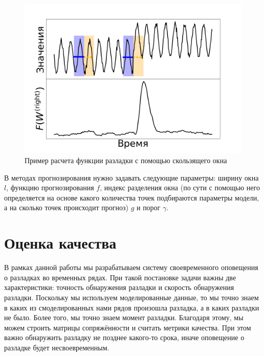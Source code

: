\documentclass[%
12pt,
master,  %
natbib,      %
subf,        %
substylefile = spbu.rtx,
href,        %
colorlinks,  %
]{disser}
\begin{document}
\begin{figure}[!hhh]
	\begin{center}
		\includegraphics[width=12cm]{approaches_first_6_ru}
	\end{center}
	\vspace{-5mm}\caption{Пример расчета функции разладки с помощью скользящего окна}
	\label{fig:predicition_example_2}
\end{figure}

В методах прогнозирования нужно задавать следующие параметры: ширину окна $l$, функцию прогнозирования $f$, индекс разделения окна (по сути с помощью него определяется на основе какого количества точек подбираются параметры модели, а на сколько точек происходит прогноз) $g$ и порог $\gamma$.



\section{Оценка качества}

В рамках данной работы мы разрабатываем систему своевременного оповещения о разладках во временных рядах. При такой постановке задачи важны две характеристики: точность обнаружения разладки и скорость обнаружения разладки. Поскольку мы используем моделированные данные, то мы точно знаем в каких из смоделированных нами рядов произошла разладка, а в каких разладки не было. Более того, мы точно знаем момент разладки. Благодаря этому, мы можем строить матрицы сопряжённости и считать метрики качества. При этом важно обнаружить разладку не позднее какого-то срока, иначе оповещение о разладке будет несвоевременным. 
\end{document}
